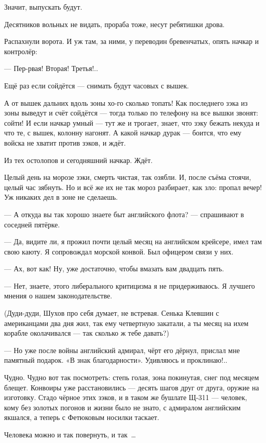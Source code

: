 Значит, выпускать будут.

Десятников вольных не видать, прораба тоже, несут ребятишки дрова.

Распахнули ворота. И уж там, за ними, у переводин бревенчатых, опять начкар и контролёр:

--- Пер-рвая! Вторая! Третья!..

Ещё раз если сойдётся --- снимать будут часовых с вышек.

А от вышек дальних вдоль зоны хо-го сколько топать! Как последнего зэка из зоны выведут и 
счёт сойдётся --- тогда только по телефону на все вышки звонят: сойти! И если начкар умный --- 
тут же и трогает, знает, что зэку бежать некуда и что те, с вышек, колонну нагонят. А какой 
начкар дурак --- боится, что ему войска не хватит против зэков, и ждёт.

Из тех остолопов и сегодняшний начкар. Ждёт.

Целый день на морозе зэки, смерть чистая, так озябли. И, после съёма стоячи, целый час зябнуть. 
Но и всё же их не так мороз разбирает, как зло: пропал вечер! Уж никаких дел в зоне не сделаешь.

--- А откуда вы так хорошо знаете быт английского флота? --- спрашивают в соседней пятёрке.

--- Да, видите ли, я прожил почти целый месяц на английском крейсере, имел там свою каюту. Я 
сопровождал морской конвой. Был офицером связи у них.

--- Ах, вот как! Ну, уже достаточно, чтобы вмазать вам двадцать пять.

--- Нет, знаете, этого либерального критицизма я не придерживаюсь. Я лучшего мнения о нашем 
законодательстве.

(Дуди-дуди, Шухов про себя думает, не встревая. Сенька Клевшин с американцами два дня жил, так 
ему четвертную закатали, а ты месяц на ихем корабле околачивался --- так сколько ж тебе 
давать?)

--- Но уже после войны английский адмирал, чёрт его дёрнул, прислал мне памятный подарок. «В 
знак благодарности». Удивляюсь и проклинаю!..

Чудно. Чудно вот так посмотреть: степь голая, зона покинутая, снег под месяцем блещет. 
Конвоиры уже расстановились --- десять шагов друг от друга, оружие на изготовку. Стадо чёрное 
этих зэков, и в таком же бушлате Щ-311 --- человек, кому без золотых погонов и жизни было не 
знато, с адмиралом английским якшался, а теперь с Фетюковым носилки таскает.

Человека можно и так повернуть, и так~\dots{}

